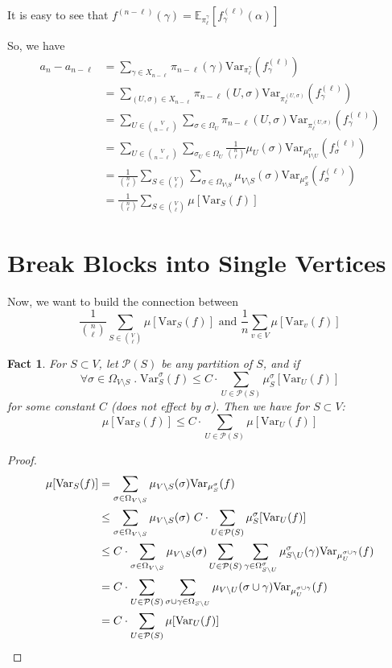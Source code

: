 \documentclass{article}
\newtheorem{fact}{Fact}[section]
\def\Var{\mathrm{Var}}
\begin{document}
It is easy to see that $f^{(n-\ell)}(\gamma) = \mathbb{E}_{\pi^\gamma_\ell} [f^{(\ell)}_\gamma(\alpha)]$

So, we have
\begin{align*}
  a_n - a_{n-\ell}
  &= \sum_{\gamma\in X_{n-\ell}} \pi_{n-\ell}(\gamma) \Var_{\pi^\gamma_\ell}(f^{(\ell)}_\gamma) \\
  &= \sum_{(U,\sigma)\in X_{n-\ell}} \pi_{n-\ell}(U, \sigma) \Var_{\pi^{(U,\sigma)}_\ell}(f^{(\ell)}_\gamma) \\
  &= \sum_{U\in\binom{V}{n-\ell}}\sum_{\sigma\in \Omega_U} \pi_{n-\ell}(U, \sigma) \Var_{\pi^{(U,\sigma)}_\ell}(f^{(\ell)}_\gamma) \\
  &= \sum_{U\in\binom{V}{n-\ell}}\sum_{\sigma_U\in \Omega_U} \frac{1}{\binom{n}{\ell}}\mu_U(\sigma) \Var_{\mu^\sigma_{V\setminus U}}(f^{(\ell)}_\sigma) \\
  &= \frac{1}{\binom{n}{\ell}}\sum_{S\in\binom{V}{\ell}}\sum_{\sigma\in\Omega_{V\setminus S}} \mu_{V\setminus S}(\sigma)\Var_{\mu^\sigma_S}(f^{(\ell)}_\sigma) \\
  &= \frac{1}{\binom{n}{\ell}} \sum_{S\in\binom{V}{\ell}} \mu [\Var_S(f)]
\end{align*}

\section{Break Blocks into Single Vertices}

Now, we want to build the connection between
\[\frac{1}{\binom{n}{\ell}} \sum_{S\in\binom{V}{\ell}}\mu[\Var_S(f)] \mbox{ and } \frac{1}{n}\sum_{v\in V} \mu[\Var_v(f)]\]

\begin{fact}
  For $S\subset V$, let $\mathcal{P}(S)$ be any partition of $S$, and if 
  \[\forall \sigma \in \Omega_{V\setminus S} \;.\; \Var_S^\sigma(f) \leq C \cdot \sum_{U\in \mathcal{P}(S)} \mu^\sigma_S[\Var_U(f)]\] for some constant $C$ (does not effect by $\sigma$).
  Then we have for $S\subset V$:
  \[\mu[\Var_S(f)] \leq C\cdot \sum_{U\in\mathcal{P}(S)} \mu[\Var_U(f)]\]
\end{fact}

\begin{proof}
  \begin{align*}
    \mu[\Var_S(f)]
    &= \sum_{\sigma\in\Omega_{V\setminus S}}\mu_{V\setminus S}(\sigma) \Var_{\mu^\sigma_S}(f) \\
    &\leq \sum_{\sigma\in\Omega_{V\setminus S}}\mu_{V\setminus S}(\sigma)\  C\cdot \sum_{U\in\mathcal{P}(S)} \mu^\sigma_S[\Var_U(f)] \\
    &\leq C\cdot \sum_{\sigma\in\Omega_{V\setminus S}}\mu_{V\setminus S}(\sigma) \sum_{U\in\mathcal{P}(S)} \sum_{\gamma\in\Omega^\sigma_{S\setminus U}}\mu^\sigma_{S\setminus U}(\gamma) \Var_{\mu^{\sigma\cup\gamma}_U}(f) \\
    &= C\cdot \sum_{U\in\mathcal{P}(S)} \sum_{\sigma\cup\gamma\in \Omega_{S\setminus U}} \mu_{V\setminus U} (\sigma\cup\gamma) \Var_{\mu^{\sigma\cup\gamma}_U}(f) \\
    &= C\cdot \sum_{U\in\mathcal{P}(S)} \mu[\Var_U(f)] \qedhere
  \end{align*}
\end{proof}
\end{document}
